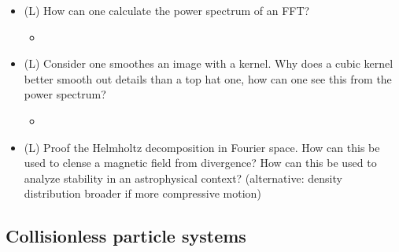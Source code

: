 \begin{itemize}
    \item (L) How can one calculate the power spectrum of an FFT?
    \begin{itemize}
        \item {}
    \end{itemize}
    \answerboxM
    \item (L) Consider one smoothes an image with a kernel. Why does a cubic kernel better smooth out details than a top hat one, how can one see this from the power spectrum?
    \begin{itemize}
        \item {}
    \end{itemize}
    \answerboxM
    \item (L) Proof the Helmholtz decomposition in Fourier space. How can this be used to clense a
    magnetic field from divergence? How can this be used to analyze stability in an astrophysical context?
    (alternative: density distribution broader if more compressive motion)
    \answerboxL
\end{itemize}

\subsection*{Collisionless particle systems}

